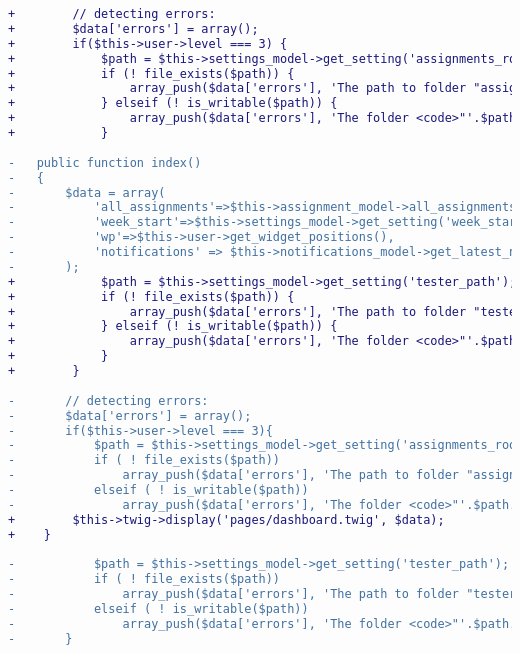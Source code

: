 \begin{lstlisting}[language=diff, basicstyle=\ttfamily, frame=single,
	columns=fullflexible, keepspaces=true, breaklines=true, label=ck:31, caption=Contoh penggunaan PHP CS Fixer pada \textit{Dashboard.php}]
+        // detecting errors:
+        $data['errors'] = array();
+        if($this->user->level === 3) {
+            $path = $this->settings_model->get_setting('assignments_root');
+            if (! file_exists($path)) {
+                array_push($data['errors'], 'The path to folder "assignments" is not set correctly. Move this folder somewhere not publicly accessible, and set its full path in Settings.');
+            } elseif (! is_writable($path)) {
+                array_push($data['errors'], 'The folder <code>"'.$path.'"</code> is not writable by PHP. Make it writable. But make sure that this folder is only accessible by you. Codes will be saved in this folder!');
+            }
			
-	public function index()
-	{
-		$data = array(
-			'all_assignments'=>$this->assignment_model->all_assignments(),
-			'week_start'=>$this->settings_model->get_setting('week_start'),
-			'wp'=>$this->user->get_widget_positions(),
-			'notifications' => $this->notifications_model->get_latest_notifications()
-		);
+            $path = $this->settings_model->get_setting('tester_path');
+            if (! file_exists($path)) {
+                array_push($data['errors'], 'The path to folder "tester" is not set correctly. Move this folder somewhere not publicly accessible, and set its full path in Settings.');
+            } elseif (! is_writable($path)) {
+                array_push($data['errors'], 'The folder <code>"'.$path.'"</code> is not writable by PHP. Make it writable. But make sure that this folder is only accessible by you.');
+            }
+        }
			
-		// detecting errors:
-		$data['errors'] = array();
-		if($this->user->level === 3){
-			$path = $this->settings_model->get_setting('assignments_root');
-			if ( ! file_exists($path))
-				array_push($data['errors'], 'The path to folder "assignments" is not set correctly. Move this folder somewhere not publicly accessible, and set its full path in Settings.');
-			elseif ( ! is_writable($path))
-				array_push($data['errors'], 'The folder <code>"'.$path.'"</code> is not writable by PHP. Make it writable. But make sure that this folder is only accessible by you. Codes will be saved in this folder!');
+        $this->twig->display('pages/dashboard.twig', $data);
+    }
			
-			$path = $this->settings_model->get_setting('tester_path');
-			if ( ! file_exists($path))
-				array_push($data['errors'], 'The path to folder "tester" is not set correctly. Move this folder somewhere not publicly accessible, and set its full path in Settings.');
-			elseif ( ! is_writable($path))
-				array_push($data['errors'], 'The folder <code>"'.$path.'"</code> is not writable by PHP. Make it writable. But make sure that this folder is only accessible by you.');
-		}
		

\end{lstlisting}
